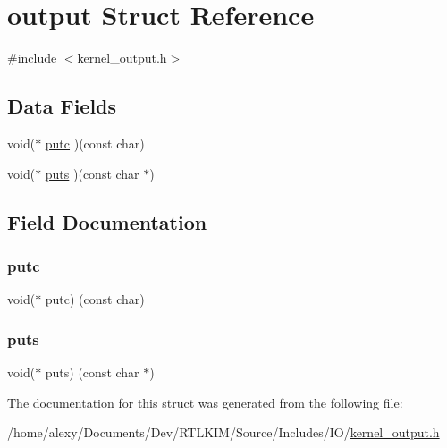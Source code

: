 \hypertarget{structoutput}{}\section{output Struct Reference}
\label{structoutput}


{\ttfamily \#include $<$kernel\+\_\+output.\+h$>$}

\subsection*{Data Fields}
\begin{DoxyCompactItemize}
\item 
void($\ast$ \hyperlink{structoutput_a9ee64a6259c86ada2375b2911bfa76e5}{putc} )(const char)
\item 
void($\ast$ \hyperlink{structoutput_a60e36e1ad2fded317fc7c07264039a2c}{puts} )(const char $\ast$)
\end{DoxyCompactItemize}


\subsection{Field Documentation}
\mbox{\label{structoutput_a9ee64a6259c86ada2375b2911bfa76e5}} 
\subsubsection{\texorpdfstring{putc}{putc}}
{\footnotesize\ttfamily void($\ast$ putc) (const char)}

\mbox{\label{structoutput_a60e36e1ad2fded317fc7c07264039a2c}} 
\subsubsection{\texorpdfstring{puts}{puts}}
{\footnotesize\ttfamily void($\ast$ puts) (const char $\ast$)}



The documentation for this struct was generated from the following file\+:\begin{DoxyCompactItemize}
\item 
/home/alexy/\+Documents/\+Dev/\+R\+T\+L\+K\+I\+M/\+Source/\+Includes/\+I\+O/\hyperlink{kernel__output_8h}{kernel\+\_\+output.\+h}\end{DoxyCompactItemize}
